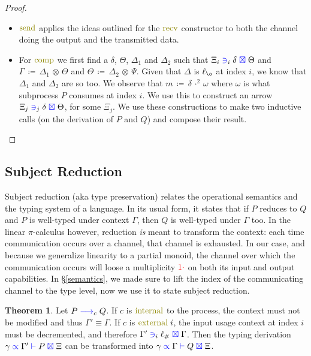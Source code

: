 \documentclass[a4paper,UKenglish,cleveref, autoref, thm-restate,authorcolumns]{lipics-v2019}
\theoremstyle{definition}
\newtheorem{nitheorem}[theorem]{Theorem}
\newcommand{\picalc}{$\pi$-calculus}
\newcommand{\type}[1]{\textcolor{blue}{\operatorname{#1}}}
\newcommand{\constr}[1]{\textcolor{olive}{\operatorname{#1}}}
\newcommand{\field}[1]{\textcolor{red}{\operatorname{#1}}}
\newcommand{\opsquared}[3]{#1 \, \coloneqq \, #2 \, \cdot^2 \, #3}
\newcommand{\opctx}[3]{#1 \, \coloneqq \, #2 \, \otimes \, #3}
\newcommand{\one}{\field{1\cdot}}
\newcommand{\reduce}[1]{\; \type{\longrightarrow}_{#1} \;}
\newcommand{\types}[4]{#1 \; \type{\propto} \; #2 \; \type{\vdash} \; #3 \; \type{\boxtimes} \; #4}
\newcommand{\containsusage}[4]{#1 \; \type{\ni}_{#2} \; #3 \; \type{\boxtimes} \; #4}
\begin{document}
\begin{proof}
\begin{itemize}
    \item
      $\constr{send}$ applies the ideas outlined for the $\constr{recv}$ constructor to both the channel doing the output and the transmitted data.

    \item
      For $\constr{comp}$ we first find a $\delta$, $\Theta$, $\Delta_1$ and $\Delta_2$ such that $\containsusage{\Xi_i}{i}{\delta}{\Theta}$ and $\opctx{\Gamma}{\Delta_1}{\Theta}$ and $\opctx{\Theta}{\Delta_2}{\Psi}$.
      Given that $\Delta$ is $\ell_{\o}$ at index $i$, we know that $\Delta_1$ and $\Delta_2$ are so too.
      We observe that $\opsquared{m}{\delta}{\omega}$ where $\omega$ is what subprocess $P$ consumes at index $i$.
      We use this to construct an arrow $\containsusage{\Xi_j}{j}{\delta}{\Theta}$, for some $\Xi_j$.
      We use these constructions to make two inductive calls (on the derivation of $P$ and $Q$) and compose their result.
  \end{itemize}  
\end{proof}


\subsection{Subject Reduction}
\label{subject-reduction}

Subject reduction (aka type preservation) relates the operational semantics and the typing system of a language.
In its usual form, it states that if $P$ reduces to $Q$ and $P$ is well-typed under context $\Gamma$, then $Q$ is well-typed under $\Gamma$ too.
In the linear \picalc{} however, reduction \emph{is} meant to transform the context: each time communication occurs over a channel, that channel is exhausted.
In our case, and because we generalize linearity to a partial monoid, the channel over which the communication occurs will loose a multiplicity $\one$ on both its input and output capabilities.
In \S \ref{semantics}, we made sure to lift the index of the communicating channel to the type level, now we use it to state subject reduction.

\begin{nitheorem}
  Let $P \reduce{c} Q$.
  If $c$ is $\constr{internal}$ to the process, the context must not be modified and thus $\Gamma' \equiv \Gamma$.
  If $c$ is $\constr{external}\; i$, the input usage context at index $i$ must be decremented, and therefore $\containsusage{\Gamma'}{i}{\ell_\#}{\Gamma}$.
  Then the typing derivation $\types{\gamma}{\Gamma'}{P}{\Xi}$ can be transformed into $\types{\gamma}{\Gamma}{Q}{\Xi}$.
\end{nitheorem}
\end{document}
